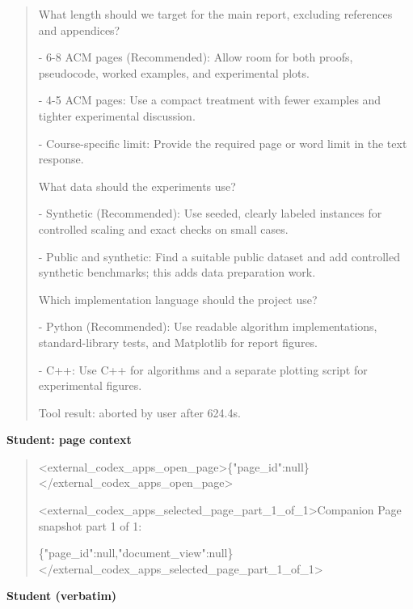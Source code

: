 \begin{quote}\small\raggedright

What length should we target for the main report, excluding references and appendices?\par
- 6-8 ACM pages (Recommended): Allow room for both proofs, pseudocode, worked examples, and experimental plots.\par
- 4-5 ACM pages: Use a compact treatment with fewer examples and tighter experimental discussion.\par
- Course-specific limit: Provide the required page or word limit in the text response.\par
What data should the experiments use?\par
- Synthetic (Recommended): Use seeded, clearly labeled instances for controlled scaling and exact checks on small cases.\par
- Public and synthetic: Find a suitable public dataset and add controlled synthetic benchmarks; this adds data preparation work.\par
Which implementation language should the project use?\par
- Python (Recommended): Use readable algorithm implementations, standard-library tests, and Matplotlib for report figures.\par
- C++: Use C++ for algorithms and a separate plotting script for experimental figures.\par
Tool result: aborted by user after 624.4s.\par

\end{quote}

\par\medskip\noindent\textbf{Student: page context}\par

\begin{quote}\small\raggedright

<external\_codex\_apps\_open\_page>\{"page\_id":null\}</external\_codex\_apps\_open\_page>\par
<external\_codex\_apps\_selected\_page\_part\_1\_of\_1>Companion Page snapshot part 1 of 1:\par
\{"page\_id":null,"document\_view":null\}</external\_codex\_apps\_selected\_page\_part\_1\_of\_1>\par

\end{quote}

\par\medskip\noindent\textbf{Student (verbatim)}\par

